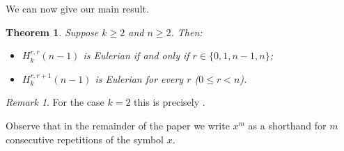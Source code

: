 \documentclass[a4paper,11pt]{article}
\theoremstyle{plain}
\newtheorem{theorem}[lemma]{Theorem}
\theoremstyle{definition}
\theoremstyle{remark}
\newtheorem{remark}{Remark}[section]
\begin{document}
We can now give our main result.

\begin{theorem}  \label{theorem:Hamming_characterisation}
Suppose $k\geq2$ and $n\geq 2$. Then:
\begin{itemize}
\item[(i)] $H_k^{r,r}(n-1)$ is Eulerian if and only if $r\in\{0,1,n-1,n\}$;
\item[(ii)] $H_k^{r,r+1}(n-1)$ is Eulerian for every $r$ ($0\leq r<n$).
\end{itemize}
\end{theorem}

\begin{remark}
For the case $k=2$ this is precisely \cite[Theorem 2.4]{Ruskey12}.
\end{remark}

Observe that in the remainder of the paper we write $x^m$ as a shorthand for $m$ consecutive
repetitions of the symbol $x$.
\end{document}
